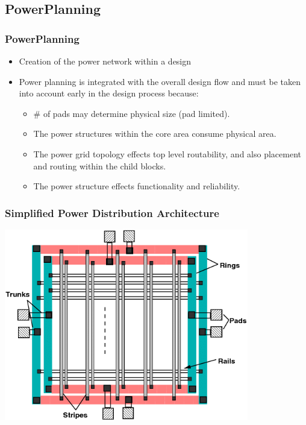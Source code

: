 \documentclass[compress]{beamer}
\begin{document}
\subsection[Power]{PowerPlanning}
\begin{frame}
	\frametitle{PowerPlanning}
	\begin{itemize}
		\item Creation of the power network within a design
		\item Power planning is integrated with the overall design flow and must be taken into account early in the design process because: 
			\begin{itemize}
				\item \# of pads may determine physical size (pad limited). 
				\item The power structures within the core area consume physical area.
				\item The power grid topology effects top level routability, and also placement and routing within the child blocks.
				\item The power structure effects functionality and reliability.
			\end{itemize}
	\end{itemize}
\end{frame}

\begin{frame}
	\frametitle{Simplified Power Distribution Architecture}
	\begin{center}
		\includegraphics[width=0.8\textwidth]{Power-Ground-Distribution-Network}
	\end{center}
\end{frame}
\end{document}

